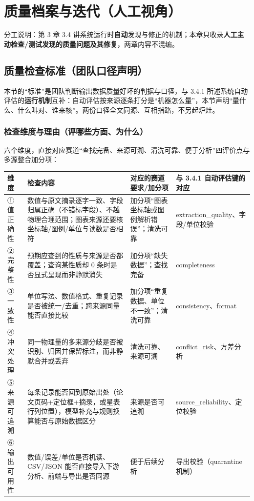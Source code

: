 \section{质量档案与迭代（人工视角）}

\noindent 分工说明：第 3 章 3.4 讲系统运行时\textbf{自动}发现与修正的机制；本章只收录\textbf{人工主动检查/测试发现的质量问题及其修复}，两章内容不混编。

\subsection{质量检查标准（团队口径声明）}

本节的“标准”是团队判断输出数据质量好坏的判据与口径，与 3.4.1 所述系统自动评估的\textbf{运行机制}互补：自动评估按来源逐条打分是“机器怎么量”，本节声明“量什么、什么叫对、谁来核”。两份口径全文同源、互相指路，不另起炉灶。

\subsubsection{检查维度与理由（评哪些方面、为什么）}

六个维度，直接对应赛道“查找完备、来源可溯、清洗可靠、便于分析”四评价点与多源整合加分项：

\begin{longtable}{@{}p{1.9cm}p{6.5cm}p{4.0cm}p{2.7cm}@{}}
\toprule
维度 & 检查内容 & 对应的赛道要求/加分项 & 与 3.4.1 自动评估键的对应 \\
\midrule
① 值正确性 & 数值与原文摘录逐字一致、字段归属正确（不错标字段）、不越物理合理范围；图表来源还要核坐标轴/图例/单位与读数是否相符 & 加分项“图表坐标轴或图例解析错误”；清洗可靠 & extraction\_quality、字段/单位校验 \\
② 完整性 & 预期应查到的性质与来源是否都覆盖；查询某性质却 0 条时是否显式呈现而非静默消失 & 加分项“缺失数据”；查找完备 & completeness \\
③ 一致性 & 单位写法、数值格式、重复记录是否被统一/去重；跨来源同量能否直接比较 & 加分项“重复数据、单位不一致”；清洗可靠 & consistency、format \\
④ 冲突处理 & 同一物理量的多来源分歧是否被识别、归因并保留标注，而非静默合并或丢弃 & 清洗可靠、来源可溯 & conflict\_risk、方差分析 \\
⑤ 来源可追溯 & 每条记录能否回到原始出处（论文页码+定位框+摘录，或星表行列位置），模型补充与规则换算能否与原始数据区分 & 来源是否可追溯 & source\_reliability、定位校验 \\
⑥ 输出可用性 & 数值/误差/单位是否机读、CSV/JSON 能否直接导入下游分析、前端与导出是否同源 & 便于后续分析 & 导出校验（quarantine 机制） \\
\bottomrule
\end{longtable}

